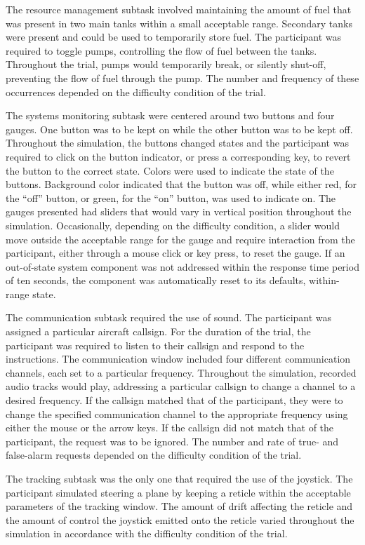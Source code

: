 \documentclass[11pt]{article}
\begin{document}
	The resource management subtask involved maintaining the amount of fuel that was present in two main tanks within a small acceptable range. Secondary tanks were present and could be used to temporarily store fuel. The participant was required to toggle pumps, controlling the flow of fuel between the tanks. Throughout the trial, pumps would temporarily break, or silently shut-off, preventing the flow of fuel through the pump. The number and frequency of these occurrences depended on the difficulty condition of the trial.
	
	The systems monitoring subtask were centered around two buttons and four gauges. One button was to be kept on while the other button was to be kept off. Throughout the simulation, the buttons changed states and the participant was required to click on the button indicator, or press a corresponding key, to revert the button to the correct state. Colors were used to indicate the state of the buttons. Background color indicated that the button was off, while either red, for the ``off'' button, or green, for the ``on'' button, was used to indicate on. The gauges presented had sliders that would vary in vertical position throughout the simulation. Occasionally, depending on the difficulty condition, a slider would move outside the acceptable range for the gauge and require interaction from the participant, either through a mouse click or key press, to reset the gauge. If an out-of-state system component was not addressed within the response time period of ten seconds, the component was automatically reset to its defaults, within-range state.
	
	The communication subtask required the use of sound. The participant was assigned a particular aircraft callsign. For the duration of the trial, the participant was required to listen to their callsign and respond to the instructions. The communication window included four different communication channels, each set to a particular frequency. Throughout the simulation, recorded audio tracks would play, addressing a particular callsign to change a channel to a desired frequency. If the callsign matched that of the participant, they were to change the specified communication channel to the appropriate frequency using either the mouse or the arrow keys. If the callsign did not match that of the participant, the request was to be ignored. The number and rate of true- and false-alarm requests depended on the difficulty condition of the trial.
	
	The tracking subtask was the only one that required the use of the joystick. The participant simulated steering a plane by keeping a reticle within the acceptable parameters of the tracking window. The amount of drift affecting the reticle and the amount of control the joystick emitted onto the reticle varied throughout the simulation in accordance with the difficulty condition of the trial. 
	
\end{document}
